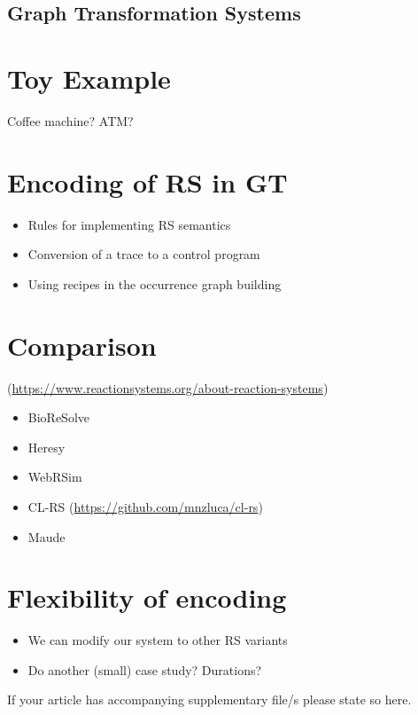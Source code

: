 \documentclass[sn-mathphys-num,a4paper,iicol,lineno,pdflatex]{sn-jnl-hacked}
\theoremstyle{thmstyleone}%
\theoremstyle{thmstyletwo}%
\theoremstyle{thmstylethree}%
\begin{document}
\subsection{Graph Transformation Systems}

\section{Toy Example}

Coffee machine? ATM?

\section{Encoding of RS in GT}
\begin{itemize}
\item Rules for implementing RS semantics
\item Conversion of a trace to a control program
\item Using recipes in the occurrence graph building
\end{itemize}

\section{Comparison}
(\url{https://www.reactionsystems.org/about-reaction-systems})
\begin{itemize}
\item BioReSolve
\item Heresy
\item WebRSim
\item CL-RS (\url{https://github.com/mnzluca/cl-rs})
\item Maude
\end{itemize}

\section{Flexibility of encoding}
\begin{itemize}
\item We can modify our system to other RS variants
\item Do another (small) case study? Durations?
\end{itemize}



\backmatter


If your article has accompanying supplementary file/s please state so here. 
\end{document}
